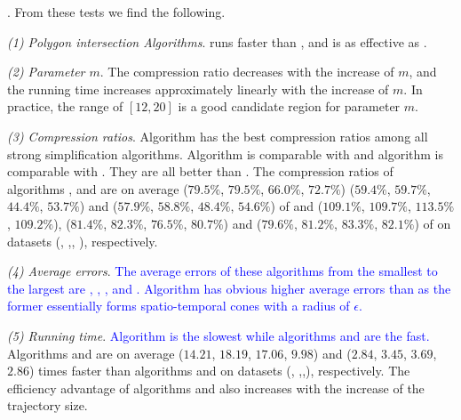 .
From these tests we find the following.

\sstab \emph{(1) Polygon intersection Algorithms}. \rpia runs faster than \cpia, and is as effective as \cpia.

\sstab\emph{(2) Parameter $m$}. The compression ratio decreases with the increase of $m$, and the running time increases approximately linearly with the increase of $m$. In practice, the range of $[12, 20]$ is a good candidate region for parameter $m$.

\sstab\emph{(3) Compression ratios}. Algorithm \cisto has the best compression ratios among all strong simplification algorithms. Algorithm \cist is comparable with \dps and algorithm \cista is comparable with \cisto.
They are all better than \squishe.
The compression ratios of algorithms \cist, \cisto and \cista are on average
($79.5\%$, $79.5\%$, $66.0\%$, $72.7\%$)
{($59.4\%$, $59.7\%$, $44.4\%$, $53.7\%$)} and ($57.9\%$, $58.8\%$, $48.4\%$, $54.6\%$) of \squishe
and ($109.1\%$, $109.7\%$, $113.5\%$, $109.2\%$), {($81.4\%$, $82.3\%$, $76.5\%$, $80.7\%$)} and ($79.6\%$, $81.2\%$, $83.3\%$, $82.1\%$) of \dps on {datasets} (\sercar, \geolife,\mopsi, \pricar), respectively.



\sstab\emph{(4) Average errors}. \textcolor{blue}{The average errors of these algorithms from the smallest to the largest are \squishe, \dps, \cist, \cisto and \cista. Algorithm \cista has obvious higher average errors than \cist as the former essentially forms spatio-temporal cones with a radius of $\epsilon$.}


\sstab\emph{(5) Running time}. \textcolor{blue}{Algorithm \cisto is the slowest while algorithms \cist and \cista are the fast.} Algorithms \cist and \cista are on average
($14.21$, $18.19$, $17.06$, $9.98$) and ($2.84$, $3.45$, $3.69$, $2.86$) times faster than algorithms \dps and \squishe on {datasets} (\sercar, {\geolife},\mopsi,\pricar), respectively.
The efficiency advantage of algorithms \cist and \cista also increases  with the increase of the trajectory size.






